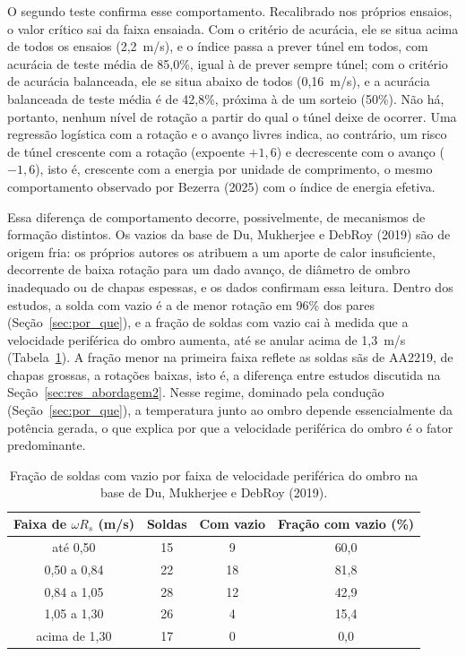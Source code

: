 \documentclass[12pt,openany]{report}
\begin{document}
O segundo teste confirma esse comportamento. Recalibrado nos próprios ensaios, o valor crítico sai da faixa ensaiada. Com o critério de acurácia, ele se situa acima de todos os ensaios (2,2~m/s), e o índice passa a prever túnel em todos, com acurácia de teste média de 85,0\%, igual à de prever sempre túnel; com o critério de acurácia balanceada, ele se situa abaixo de todos (0,16~m/s), e a acurácia balanceada de teste média é de 42,8\%, próxima à de um sorteio (50\%). Não há, portanto, nenhum nível de rotação a partir do qual o túnel deixe de ocorrer. Uma regressão logística com a rotação e o avanço livres indica, ao contrário, um risco de túnel crescente com a rotação (expoente $+1{,}6$) e decrescente com o avanço ($-1{,}6$), isto é, crescente com a energia por unidade de comprimento, o mesmo comportamento observado por Bezerra (2025) com o índice de energia efetiva.

Essa diferença de comportamento decorre, possivelmente, de mecanismos de formação distintos. Os vazios da base de Du, Mukherjee e DebRoy (2019) são de origem fria: os próprios autores os atribuem a um aporte de calor insuficiente, decorrente de baixa rotação para um dado avanço, de diâmetro de ombro inadequado ou de chapas espessas, e os dados confirmam essa leitura. Dentro dos estudos, a solda com vazio é a de menor rotação em 96\% dos pares (Seção~\ref{sec:por_que}), e a fração de soldas com vazio cai à medida que a velocidade periférica do ombro aumenta, até se anular acima de 1,3~m/s (Tabela~\ref{tab:faixas_wrs}). A fração menor na primeira faixa reflete as soldas sãs de AA2219, de chapas grossas, a rotações baixas, isto é, a diferença entre estudos discutida na Seção~\ref{sec:res_abordagem2}. Nesse regime, dominado pela condução (Seção~\ref{sec:por_que}), a temperatura junto ao ombro depende essencialmente da potência gerada, o que explica por que a velocidade periférica do ombro é o fator predominante.

\begin{table}[htbp]
\centering
\caption{Fração de soldas com vazio por faixa de velocidade periférica do ombro na base de Du, Mukherjee e DebRoy (2019).}
\label{tab:faixas_wrs}
\small
\begin{tabular}{cccc}
\toprule
\textbf{Faixa de $\omega R_s$ (m/s)} & \textbf{Soldas} & \textbf{Com vazio} & \textbf{Fração com vazio (\%)} \\ \midrule
até 0,50 & 15 & 9 & 60,0 \\
0,50 a 0,84 & 22 & 18 & 81,8 \\
0,84 a 1,05 & 28 & 12 & 42,9 \\
1,05 a 1,30 & 26 & 4 & 15,4 \\
acima de 1,30 & 17 & 0 & 0,0 \\ \bottomrule
\end{tabular}
\end{table}
\end{document}
